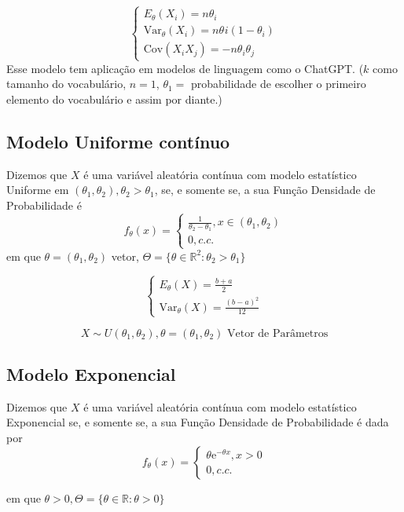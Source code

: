 \documentclass[
  letterpaper,
  DIV=11,
  numbers=noendperiod]{scrreprt}
\begin{document}
\[
\begin{cases}
E_\theta(X_{i})=n\theta_{i}\\
\mathrm{Var}_\theta(X_{i}) = n\theta_{}i (1-\theta_{i}) \\
\mathrm{Cov}(X_{i}X_{j})=-n\theta_{i}\theta_{j}
\end{cases}
\] Esse modelo tem aplicação em modelos de linguagem como o ChatGPT.
(\(k\) como tamanho do vocabulário, \(n=1\), \(\theta_{1}=\)
probabilidade de escolher o primeiro elemento do vocabulário e assim por
diante.)

\subsection{Modelo Uniforme contínuo}\label{modelo-uniforme-contuxednuo}

Dizemos que \(X\) é uma variável aleatória contínua com modelo
estatístico Uniforme em
\((\theta_{1}, \theta_{2}), \theta_{2}>\theta_{1}\), se, e somente se, a
sua Função Densidade de Probabilidade é \[
f_\theta(x)=\begin{cases}
\frac{1}{\theta_{2}-\theta_{1}}, x \in(\theta_{1}, \theta_{2}) \\
0, c.c.
\end{cases}
\] em que \(\theta=(\theta_{1}, \theta_{2})\) vetor,
\(\Theta = \{\theta \in \mathbb{R}^{2} : \theta_{2} > \theta_{1} \}\)

\[
\begin{cases}
E_\theta(X)=\frac{b+a}{2}\\
\mathrm{Var}_\theta(X) = \frac{(b-a)^{2}}{12}\end{cases}
\]

\[
X \sim U(\theta_{1}, \theta_{2}), \theta=(\theta_{1}, \theta_{2}) \text{ Vetor de Parâmetros}
\]

\subsection{Modelo Exponencial}\label{modelo-exponencial}

Dizemos que \(X\) é uma variável aleatória contínua com modelo
estatístico Exponencial se, e somente se, a sua Função Densidade de
Probabilidade é dada por \[
f_\theta(x)=\begin{cases}
\theta \mathrm{e}^{-\theta x}, x>0\\
0, c.c.
\end{cases}
\]

em que \(\theta>0, \Theta=\{\theta \in \mathbb{R}: \theta>0 \}\)
\end{document}
